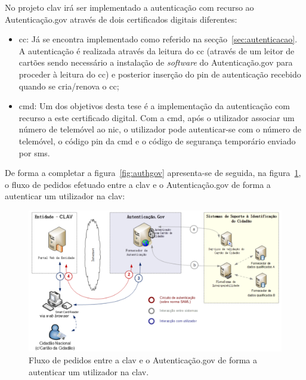 No projeto \acrshort{clav} irá ser implementado a autenticação com recurso ao Autenticação.gov através de dois 
certificados digitais diferentes:
\begin{itemize}
    \item \acrfull{cc}: Já se encontra implementado como referido na secção~\ref{sec:autenticacao}. 
    A autenticação é realizada através da leitura do \acrshort{cc} (através de um leitor de cartões sendo 
    necessário a instalação de \textit{software} do Autenticação.gov para proceder à leitura do \acrshort{cc}) e 
    posterior inserção do \acrshort{pin} de autenticação recebido quando se cria/renova o \acrshort{cc};

    \item \acrfull{cmd}: Um dos objetivos desta tese é a implementação da autenticação com recurso a este 
    certificado digital. Com a \acrshort{cmd}, após o utilizador associar um número de telemóvel ao 
    \acrshort{nic}, o utilizador pode autenticar-se com o número de telemóvel, o código \acrshort{pin} da 
    \acrshort{cmd} e o código de segurança temporário enviado por \acrshort{sms}.
\end{itemize}

De forma a completar a figura~\ref{fig:authgov} apresenta-se de seguida, na figura~\ref{fig:fluxoauthgov}, o fluxo de pedidos efetuado entre 
a \acrshort{clav} e o Autenticação.gov de forma a autenticar um utilizador na \acrshort{clav}:~\cite{agov}
\begin{figure}[H]
    \centering
    \includegraphics[width=1\textwidth]{img/fluxoauthgov.png}
    \caption{Fluxo de pedidos entre a \acrshort{clav} e o Autenticação.gov de forma a autenticar um utilizador na \acrshort{clav}.~\cite{agov}}\label{fig:fluxoauthgov}
\end{figure}

